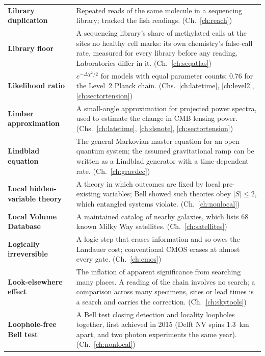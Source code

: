 {\begin{longtable}{@{}>{\raggedright\arraybackslash}p{}>{\raggedright\arraybackslash}p{}@{}}
\textbf{Library duplication} & Repeated reads of the same molecule in a sequencing library; tracked the fish readings. {\footnotesize(Ch.~\ref{ch:reach})}\\[1pt]
\textbf{Library floor} & A sequencing library's share of methylated calls at the sites no healthy cell marks: its own chemistry's false-call rate, measured for every library before any reading. Laboratories differ in it. {\footnotesize(Ch.~\ref{ch:seqatlas})}\\[1pt]
\textbf{Likelihood ratio} & $e^{-\Delta\chi^2/2}$ for models with equal parameter counts; $0.76$ for the Level~2 Planck chain. {\footnotesize(Chs.~\ref{ch:latetime}, \ref{ch:level2}, \ref{ch:sectortension})}\\[1pt]
\textbf{Limber approximation} & A small-angle approximation for projected power spectra, used to estimate the change in CMB lensing power. {\footnotesize(Chs.~\ref{ch:latetime}, \ref{ch:dsnote}, \ref{ch:sectortension})}\\[1pt]
\textbf{Lindblad equation} & The general Markovian master equation for an open quantum system; the assumed gravitational ramp can be written as a Lindblad generator with a time-dependent rate. {\footnotesize(Ch.~\ref{ch:gravdec})}\\[1pt]
\textbf{Local hidden-variable theory} & A theory in which outcomes are fixed by local pre-existing variables; Bell showed such theories obey $|S|\le2$, which entangled systems violate. {\footnotesize(Ch.~\ref{ch:nonlocal})}\\[1pt]
\textbf{Local Volume Database} & A maintained catalog of nearby galaxies, which lists 68 known Milky Way satellites. {\footnotesize(Ch.~\ref{ch:satellites})}\\[1pt]
\textbf{Logically irreversible} & A logic step that erases information and so owes the Landauer cost; conventional CMOS erases at almost every gate. {\footnotesize(Ch.~\ref{ch:cmos})}\\[1pt]
\textbf{Look-elsewhere effect} & The inflation of apparent significance from searching many places. A reading of the chain involves no search; a comparison across many specimens, sites or lead times is a search and carries the correction. {\footnotesize(Ch.~\ref{ch:skytools})}\\[1pt]
\textbf{Loophole-free Bell test} & A Bell test closing detection and locality loopholes together, first achieved in 2015 (Delft NV spins 1.3~km apart, and two photon experiments the same year). {\footnotesize(Ch.~\ref{ch:nonlocal})}\\[1pt]

\end{longtable}}
